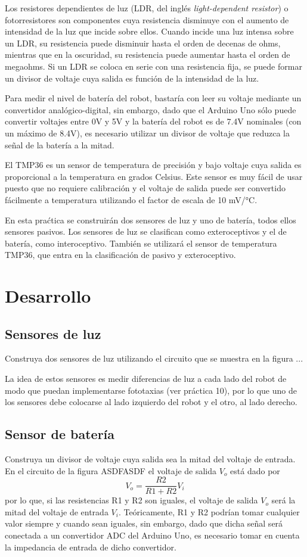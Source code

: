 \documentclass[a4paper,12pt]{article}
\newcommand\ddfrac[2]{\frac{\displaystyle #1}{\displaystyle #2}}
\begin{document}
Los resistores dependientes de luz (LDR, del inglés \textit{light-dependent resistor}) o fotorresistores son componentes cuya resistencia disminuye con el aumento de intensidad de la luz que incide sobre ellos. Cuando incide una luz intensa sobre un LDR, su resistencia puede disminuir hasta el orden de decenas de ohms, mientras que en la oscuridad, su resistencia puede aumentar hasta el orden de megaohms. Si un LDR se coloca en serie con una resistencia fija, se puede formar un divisor de voltaje cuya salida es función de la intensidad de la luz. 

Para medir el nivel de batería del robot, bastaría con leer su voltaje mediante un convertidor analógico-digital, sin embargo, dado que el Arduino Uno sólo puede convertir voltajes entre 0V y 5V y la batería del robot es de 7.4V nominales (con un máximo de 8.4V), es necesario utilizar un divisor de voltaje que reduzca la señal de la batería a la mitad. 

El TMP36 es un sensor de temperatura de precisión y bajo voltaje cuya salida es proporcional a la temperatura en grados Celsius. Este sensor es muy fácil de usar puesto que no requiere calibración y el voltaje de salida puede ser convertido fácilmente a temperatura utilizando el factor de escala de 10 mV/\si{\degree}C.

En esta praćtica se construirán dos sensores de luz y uno de batería, todos ellos sensores pasivos. Los sensores de luz se clasifican como exteroceptivos y el de batería, como interoceptivo. También se utilizará el sensor de temperatura TMP36, que entra en la clasificación de pasivo y exteroceptivo. 

\section{Desarrollo}
\subsection{Sensores de luz}
Construya dos sensores de luz utilizando el circuito que se muestra en la figura ...

La idea de estos sensores es medir diferencias de luz a cada lado del robot de modo que puedan implementarse fototaxias (ver práctica 10), por lo que uno de los sensores debe colocarse al lado izquierdo del robot y el otro, al lado derecho. 

\subsection{Sensor de batería}
Construya un divisor de voltaje cuya salida sea la mitad del voltaje de entrada. En el circuito de la figura ASDFASDF el voltaje de salida $V_o$ está dado por
\[V_o = \ddfrac{R2}{R1 + R2}V_i\]
por lo que, si las resistencias R1 y R2 son iguales, el voltaje de salida $V_o$ será la mitad del voltaje de entrada $V_i$. Teóricamente, R1 y R2 podrían tomar cualquier valor siempre y cuando sean iguales, sin embargo, dado que dicha señal será conectada a un convertidor ADC del Arduino Uno, es necesario tomar en cuenta la impedancia de entrada de dicho convertidor. 
\end{document}
